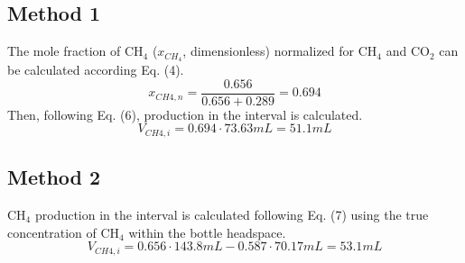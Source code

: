 \subsection{Method 1}
The mole fraction of CH$_{4}$ ($x_{CH_4}$, dimensionless) normalized for CH$_{4}$ and CO$_{2}$ can be calculated according Eq. (4). 
\begin{equation*}
    x_{CH{4},n} = \frac{0.656}{0.656 + 0.289} = 0.694
\end{equation*}
Then, following Eq. (6),  production in the interval is calculated.
\begin{equation*}
    V_{CH{4},i} = 0.694 \cdot 73.63\unit{mL} = 51.1\unit{mL}
\end{equation*}

\subsection{Method 2}
CH$_4$  production in the interval is calculated following Eq. (7) using the true concentration of CH$_4$ within the bottle headspace.
\begin{equation*}
    V_{CH{4},i} = 0.656 \cdot 143.8\unit{mL} - 0.587 \cdot 70.17\unit{mL} = 53.1\unit{mL} 
\end{equation*}


